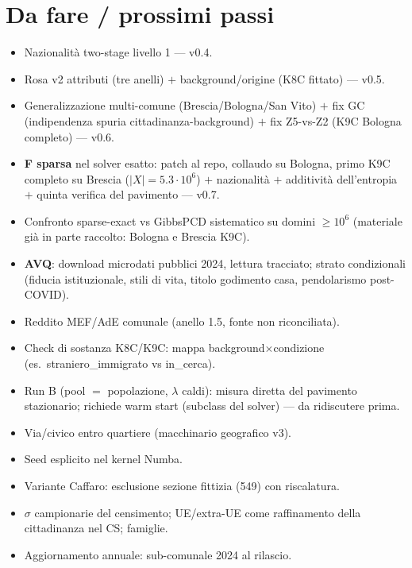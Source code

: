 \documentclass[11pt,a4paper]{article}
\begin{document}
\section{Da fare / prossimi passi}
\label{sec:todo}
\begin{itemize}[leftmargin=*,itemsep=1pt]
  \item[$\boxtimes$] Nazionalit\`a two-stage livello 1 --- v0.4.
  \item[$\boxtimes$] Rosa v2 attributi (tre anelli) $+$ background/origine
  (K8C fittato) --- v0.5.
  \item[$\boxtimes$] Generalizzazione multi-comune (Brescia/Bologna/San
  Vito) $+$ fix GC (indipendenza spuria cittadinanza-background) $+$ fix
  Z5-vs-Z2 (K9C Bologna completo) --- v0.6.
  \item[$\boxtimes$] \textbf{F sparsa} nel solver esatto: patch al repo,
  collaudo su Bologna, primo K9C completo su Brescia
  ($|X|=5.3\cdot10^6$) $+$ nazionalit\`a $+$ additivit\`a dell'entropia
  $+$ quinta verifica del pavimento --- v0.7.
  \item[$\square$] Confronto sparse-exact vs GibbsPCD sistematico su
  domini $\ge10^6$ (materiale gi\`a in parte raccolto: Bologna e Brescia
  K9C).
  \item[$\square$] \textbf{AVQ}: download microdati pubblici 2024, lettura
  tracciato; strato condizionali (fiducia istituzionale, stili di vita,
  titolo godimento casa, pendolarismo post-COVID).
  \item[$\square$] Reddito MEF/AdE comunale (anello 1.5, fonte non
  riconciliata).
  \item[$\square$] Check di sostanza K8C/K9C: mappa
  background$\times$condizione (es.\ straniero\_immigrato vs in\_cerca).
  \item[$\square$] Run B (pool $=$ popolazione, $\lambda$ caldi): misura
  diretta del pavimento stazionario; richiede warm start (subclass del
  solver) --- da ridiscutere prima.
  \item[$\square$] Via/civico entro quartiere (macchinario geografico v3).
  \item[$\square$] Seed esplicito nel kernel Numba.
  \item[$\square$] Variante Caffaro: esclusione sezione fittizia (549) con
  riscalatura.
  \item[$\square$] $\sigma$ campionarie del censimento; UE/extra-UE come
  raffinamento della cittadinanza nel CS; famiglie.
  \item[$\square$] Aggiornamento annuale: sub-comunale 2024 al rilascio.
\end{itemize}
\end{document}
